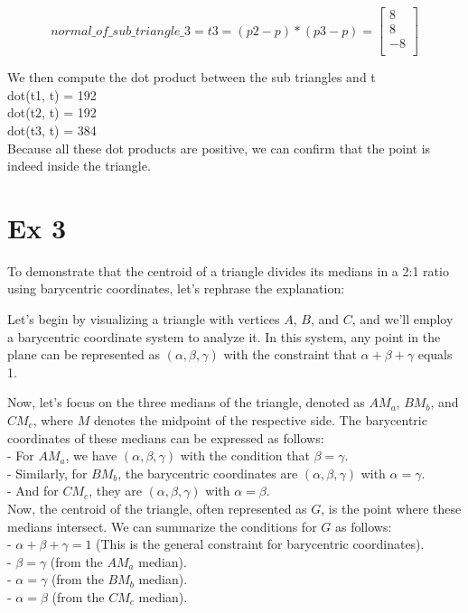 \documentclass{article}
\begin{document}
\[
    normal\_of\_sub\_triangle\_3 = t3 = (p2 - p) * (p3 - p) =
    \begin{bmatrix}
        8  \\
        8  \\
        -8 \\
    \end{bmatrix}
\]




We then compute the dot product between the sub triangles and t
\\
dot(t1, t) = 192 \\
dot(t2, t) = 192 \\
dot(t3, t) = 384 \\
Because all these dot products are positive, we can confirm that the point is indeed inside the triangle.




\cleardoublepage
\section*{Ex 3}



To demonstrate that the centroid of a triangle divides its medians in a 2:1 ratio using barycentric coordinates, let's rephrase the explanation:

Let's begin by visualizing a triangle with vertices $A$, $B$, and $C$, and we'll employ a barycentric coordinate system to analyze it. In this system, any point in the plane can be represented as $(\alpha, \beta, \gamma)$ with the constraint that $\alpha + \beta + \gamma$ equals 1.

Now, let's focus on the three medians of the triangle, denoted as $AM_a$, $BM_b$, and $CM_c$, where $M$ denotes the midpoint of the respective side. The barycentric coordinates of these medians can be expressed as follows:
\\
- For $AM_a$, we have $(\alpha, \beta, \gamma)$ with the condition that $\beta = \gamma$. \\
- Similarly, for $BM_b$, the barycentric coordinates are $(\alpha, \beta, \gamma)$ with $\alpha = \gamma$. \\
- And for $CM_c$, they are $(\alpha, \beta, \gamma)$ with $\alpha = \beta$. \\

Now, the centroid of the triangle, often represented as $G$, is the point where these medians intersect. We can summarize the conditions for $G$ as follows:
\\
- $\alpha + \beta + \gamma = 1$ (This is the general constraint for barycentric coordinates). \\
- $\beta = \gamma$ (from the $AM_a$ median). \\
- $\alpha = \gamma$ (from the $BM_b$ median). \\
- $\alpha = \beta$ (from the $CM_c$ median). \\
\end{document}
